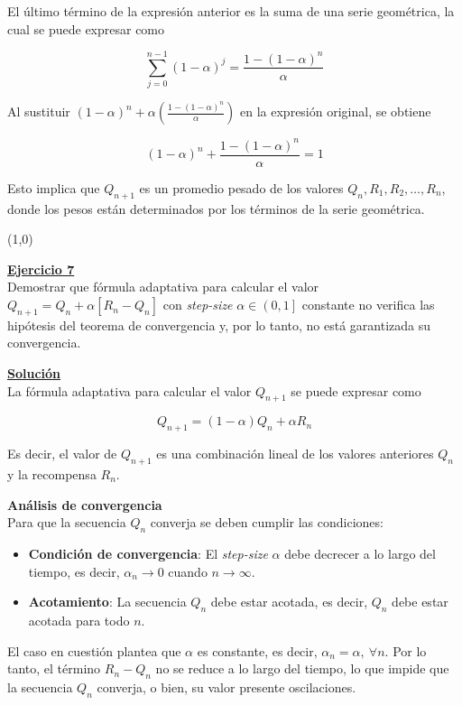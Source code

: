 \documentclass[12pt]{article}
\newlength\tindent
\renewcommand{\indent}{\hspace*{\tindent}}
\begin{document}
    El último término de la expresión anterior es la suma de una serie geométrica, la cual se puede expresar como

    \[
        \sum_{j=0}^{n-1} \left( 1-\alpha \right)^{j} = \frac{1-(1-\alpha)^n}{\alpha}
    \]

    Al sustituir $(1-\alpha)^n + \alpha \left( \frac{1-(1-\alpha)^n}{\alpha} \right)$ en la expresión original, se obtiene

    \[
        (1-\alpha)^n + \frac{1-(1-\alpha)^n}{\alpha} = 1
    \]

    Esto implica que $Q_{n+1}$ es un promedio pesado de los valores $Q_{n},R_1,R_2,\dots,R_n$, donde los pesos están determinados por los términos de la serie geométrica.

    \line(1,0){\textwidth}

    \indent\underline{\textbf{Ejercicio 7}}\\
    Demostrar que fórmula adaptativa para calcular el valor $Q_{n+1}=Q_n+\alpha\left[R_n-Q_n\right]$ con  \textit{step-size} $\alpha\in\left(0,1\right]$ constante no verifica las hipótesis del teorema de convergencia y, por lo tanto, no está garantizada su convergencia.

    \indent\underline{\textbf{Solución}}\\
    La fórmula adaptativa para calcular el valor $Q_{n+1}$ se puede expresar como

    \[
        Q_{n+1} = (1-\alpha)Q_n + \alpha R_n
    \]

    Es decir, el valor de $Q_{n+1}$ es una combinación lineal de los valores anteriores $Q_n$ y la recompensa $R_n$.

    \textbf{Análisis de convergencia}\\
    Para que la secuencia $Q_n$ converja se deben cumplir las condiciones:

    \begin{itemize}
        \item \textbf{Condición de convergencia}: El \textit{step-size} $\alpha$ debe decrecer a lo largo del tiempo, es decir, $\alpha_n \rightarrow 0$ cuando $n \rightarrow \infty$.
        \item \textbf{Acotamiento}: La secuencia $Q_n$ debe estar acotada, es decir, $Q_n$ debe estar acotada para todo $n$.
    \end{itemize}

    El caso en cuestión plantea que $\alpha$ es constante, es decir, $\alpha_n = \alpha,\ \forall n$.
    Por lo tanto, el término $R_n - Q_n$ no se reduce a lo largo del tiempo, lo que impide que la secuencia $Q_n$ converja, o bien, su valor presente oscilaciones.
\end{document}
